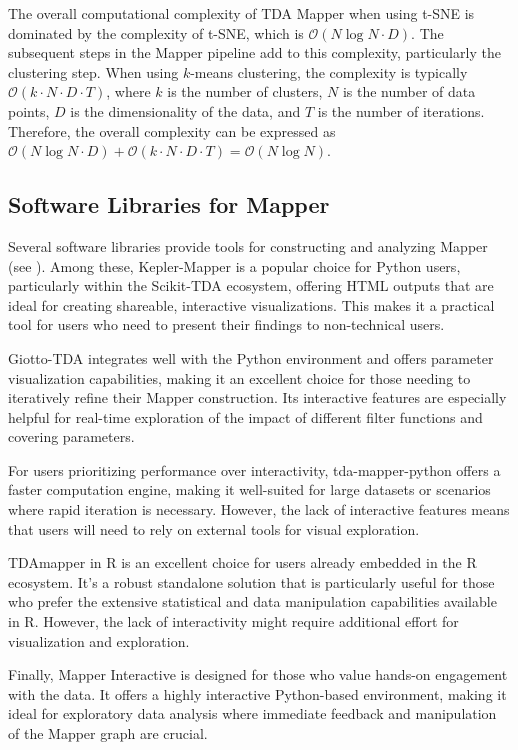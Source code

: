 The overall computational complexity of TDA Mapper when using t-SNE is dominated by the complexity of t-SNE, which is $\mathcal{O}(N \log N \cdot D)$.  The subsequent steps in the Mapper pipeline add to this complexity, particularly the clustering step. When using $k$-means clustering, the complexity is typically $\mathcal{O}(k \cdot N \cdot D \cdot T)$, where $k$ is the number of clusters, $N$ is the number of data points, $D$ is the dimensionality of the data, and $T$ is the number of iterations. Therefore, the overall complexity can be expressed as $\mathcal{O}(N \log N \cdot D) + \mathcal{O}(k \cdot N \cdot D \cdot T)=\mathcal{O}(N \log N)$. 

\subsection{Software Libraries for Mapper} \label{sec:mapper-software}

Several software libraries provide tools for constructing and analyzing Mapper (see ). Among these, Kepler-Mapper is a popular choice for Python users, particularly within the Scikit-TDA ecosystem, offering HTML outputs that are ideal for creating shareable, interactive visualizations. This makes it a practical tool for users who need to present their findings to non-technical users. 

Giotto-TDA integrates well with the Python environment and offers parameter visualization capabilities, making it an excellent choice for those needing to iteratively refine their Mapper construction. Its interactive features are especially helpful for real-time exploration of the impact of different filter functions and covering parameters.

For users prioritizing performance over interactivity, tda-mapper-python offers a faster computation engine, making it well-suited for large datasets or scenarios where rapid iteration is necessary. However, the lack of interactive features means that users will need to rely on external tools for visual exploration.

TDAmapper in R is an excellent choice for users already embedded in the R ecosystem. It’s a robust standalone solution that is particularly useful for those who prefer the extensive statistical and data manipulation capabilities available in R. However, the lack of interactivity might require additional effort for visualization and exploration.

Finally, Mapper Interactive is designed for those who value hands-on engagement with the data. It offers a highly interactive Python-based environment, making it ideal for exploratory data analysis where immediate feedback and manipulation of the Mapper graph are crucial.

